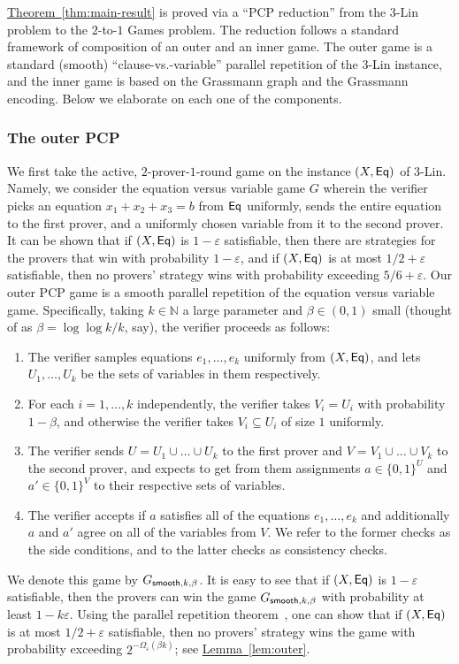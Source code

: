 \documentclass[11pt]{article}
\numberwithin{equation}{section}
\theoremstyle{definition}
\theoremstyle{plain}
\newcommand{\expref}[2]{\hyperref[#2]{#1~\ref{#2}}}
\newcommand\eps{\varepsilon}
\def\F{\mathbb{F}}
\begin{document}
\def\F{\mathbb{F}}

\expref{Theorem}{thm:main-result} is proved via a ``PCP reduction'' from the $3$-Lin
problem to the $2$-to-$1$ Games problem. The reduction follows a standard
framework of composition of an outer and an inner game. The outer game is a
standard (smooth) ``clause-vs.-variable'' parallel repetition of the 3-Lin
instance, and the inner game is based on the Grassmann graph and the Grassmann encoding.
Below we elaborate on each one of the components.

\subsubsection{The outer PCP}
We first take the active, $2$-prover-$1$-round game on the instance $(X, {\sf Eq})$ of $3$-Lin.
Namely, we consider the equation versus variable game $G$ wherein the verifier picks an equation $x_{1} + x_{2} + x_{3} = b$ from
${\sf Eq}$ uniformly, sends the entire equation to the first prover, and a uniformly chosen variable from it to the second prover.
It can be shown that if $(X, {\sf Eq})$ is $1-\eps$ satisfiable, then there are strategies for the provers that win with probability
$1-\eps$, and if $(X, {\sf Eq})$ is at most $1/2 + \eps$ satisfiable, then no provers' strategy wins with probability exceeding $5/6 +\eps$.
Our outer PCP game is a smooth parallel repetition of the equation versus variable game. Specifically, taking $k\in\mathbb{N}$ a large
parameter and $\beta\in (0,1)$ small (thought of as $\beta = \log\log k/k$, say), the verifier proceeds as follows:
\begin{enumerate}
  \item The verifier samples equations $e_1,\ldots,e_k$ uniformly from $(X, {\sf Eq})$, and lets $U_1,\ldots,U_k$ be the sets
  of variables in them respectively.
  \item For each $i=1,\ldots,k$ independently, the verifier takes $V_i = U_i$ with probability $1-\beta$, and otherwise the
  verifier takes $V_i\subseteq U_i$ of size $1$ uniformly.
  \item The verifier sends $U = U_1\cup\ldots\cup U_k$ to the first prover and $V = V_1\cup\ldots\cup V_k$ to the second prover,
  and expects to get from them assignments $a\in \{0,1\}^U$ and $a'\in \{0,1\}^{V}$ to their respective sets of variables.
  \item The verifier accepts if $a$ satisfies all of the equations $e_1,\ldots,e_k$ and additionally $a$ and $a'$ agree on
  all of the variables from $V$. We refer to the former checks as the side conditions, and to the latter checks as consistency
  checks.
\end{enumerate}
We denote this game by $G_{{\sf smooth}, k, \beta}$.
It is easy to see that if $(X,{\sf Eq})$ is $1-\eps$ satisfiable, then the provers can win the
game $G_{{\sf smooth}, k,\beta}$ with probability at least $1-k\eps$. %
Using the parallel repetition theorem~\cite{Raz98,Holenstein}, one can show that
if $(X, {\sf Eq})$ is at most $1/2+\eps$ satisfiable, then no provers' strategy wins
the game with probability exceeding $2^{-\Omega_{\eps}(\beta k)}$; see \expref{Lemma}{lem:outer}.%
%
\end{document}
